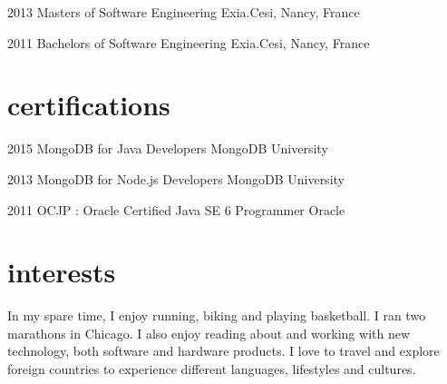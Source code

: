 \documentclass[]{friggeri-cv} %
\begin{document}
\begin{entrylist}


\entry
{2013}
{}
{Masters {\normalfont of Software Engineering}}
{}
{Exia.Cesi, Nancy, France}
{}


\entry
{2011}
{}
{Bachelors {\normalfont of Software Engineering}}
{}
{Exia.Cesi, Nancy, France}
{}


\end{entrylist}


\section{certifications}

\begin{entrylist}


\entry
{2015}
{}
{MongoDB for Java Developers}
{MongoDB University}
{}
{}

\entry
{2013}
{}
{MongoDB for Node.js Developers}
{MongoDB University}
{}
{}

\entry
{2011}
{}
{OCJP : Oracle Certified Java SE 6 Programmer}
{Oracle}
{}
{}


\end{entrylist}


\section{interests}

In my spare time, I enjoy running, biking and playing basketball. I ran two marathons in Chicago. I also enjoy reading about and working with new technology, both software and hardware products. I love to travel and explore foreign countries to experience different languages, lifestyles and cultures.
\end{document}

